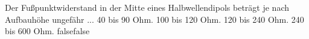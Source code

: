     {Der Fußpunktwiderstand in der Mitte eines Halbwellendipols beträgt je nach Aufbauhöhe ungefähr ...}
    {40 bis 90 Ohm.}
    {100 bis 120 Ohm.}
    {120 bis 240 Ohm.}
    {240 bis 600 Ohm.}
    {false}{false}